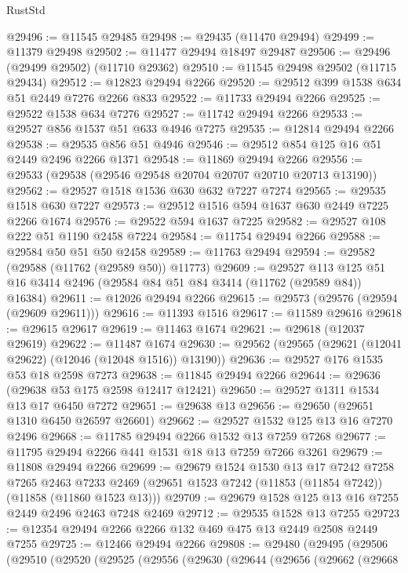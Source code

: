 \begin{lexlean}{RustStd}
\begin{coremodule}
@29496 := @11545 @29485
@29498 := @29435 (@11470 @29494)
@29499 := @11379 @29498
@29502 := @11477 @29494 @18497 @29487
@29506 := @29496 (@29499 @29502) (@11710 @29362)
@29510 := @11545 @29498 @29502 (@11715 @29434)
@29512 := @12823 @29494 @2266
@29520 := @29512 @399 @1538 @634 @51 @2449 @7276 @2266 @833
@29522 := @11733 @29494 @2266
@29525 := @29522 @1538 @634 @7276
@29527 := @11742 @29494 @2266
@29533 := @29527 @856 @1537 @51 @633 @4946 @7275
@29535 := @12814 @29494 @2266
@29538 := @29535 @856 @51 @4946
@29546 := @29512 @854 @125 @16 @51 @2449 @2496 @2266 @1371
@29548 := @11869 @29494 @2266
@29556 := @29533 (@29538 (@29546 @29548 @20704 @20707 @20710 @20713 @13190))
@29562 := @29527 @1518 @1536 @630 @632 @7227 @7274
@29565 := @29535 @1518 @630 @7227
@29573 := @29512 @1516 @594 @1637 @630 @2449 @7225 @2266 @1674
@29576 := @29522 @594 @1637 @7225
@29582 := @29527 @108 @222 @51 @1190 @2458 @7224
@29584 := @11754 @29494 @2266
@29588 := @29584 @50 @51 @50 @2458
@29589 := @11763 @29494
@29594 := @29582 (@29588 (@11762 (@29589 @50)) @11773)
@29609 := @29527
    @113
    @125
    @51
    @16
    @3414
    @2496
    (@29584 @84 @51 @84 @3414 (@11762 (@29589 @84)) @16384)
@29611 := @12026 @29494 @2266
@29615 := @29573 (@29576 (@29594 (@29609 @29611)))
@29616 := @11393 @1516
@29617 := @11589 @29616
@29618 := @29615 @29617
@29619 := @11463 @1674
@29621 := @29618 (@12037 @29619)
@29622 := @11487 @1674
@29630 := @29562 (@29565 (@29621 (@12041 @29622) (@12046 (@12048 @1516)) @13190))
@29636 := @29527 @176 @1535 @53 @18 @2598 @7273
@29638 := @11845 @29494 @2266
@29644 := @29636 (@29638 @53 @175 @2598 @12417 @12421)
@29650 := @29527 @1311 @1534 @13 @17 @6450 @7272
@29651 := @29638 @13
@29656 := @29650 (@29651 @1310 @6450 @26597 @26601)
@29662 := @29527 @1532 @125 @13 @16 @7270 @2496
@29668 := @11785 @29494 @2266 @1532 @13 @7259 @7268
@29677 := @11795 @29494 @2266 @441 @1531 @18 @13 @7259 @7266 @3261
@29679 := @11808 @29494 @2266
@29699 := @29679
    @1524
    @1530
    @13
    @17
    @7242
    @7258
    @7265
    @2463
    @7233
    @2469
    (@29651 @1523 @7242 (@11853 (@11854 @7242)) (@11858 (@11860 @1523 @13)))
@29709 := @29679 @1528 @125 @13 @16 @7255 @2449 @2496 @2463 @7248 @2469
@29712 := @29535 @1528 @13 @7255
@29723 := @12354 @29494 @2266 @2266 @132 @469 @475 @13 @2449 @2508 @2449 @7255
@29725 := @12466 @29494 @2266
@29808 := @29480
    (@29495
      (@29506
        (@29510
          (@29520
            (@29525
              (@29556
                (@29630
                  (@29644
                    (@29656
                      (@29662
                        (@29668

\end{coremodule}
\end{lexlean}
